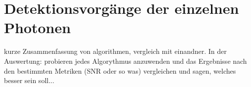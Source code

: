 \section{Detektionsvorgänge der einzelnen Photonen}
\label{text:single_photon_theorie}
kurze Zusammenfassung von algorithmen, vergleich mit einandner. In der Auswertung: probieren jedes Algorythmus anzuwenden und das Ergebnisse nach den bestimmten Metriken (SNR oder so was) vergleichen und sagen, welches besser sein soll...
\newpage